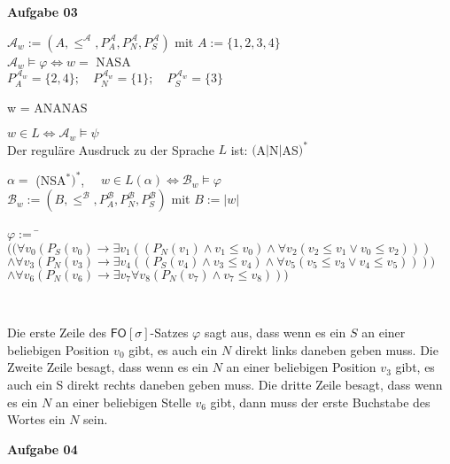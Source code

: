 \documentclass[a4paper,10pt]{article}
\begin{document}
	\textbf{Aufgabe 03}
	\begin{compactenum} [(a)]
		\item $ \mathcal{A}_w := (A, \leq^\mathcal{A}, P_A^\mathcal{A}, P_N^\mathcal{A}, P_S^\mathcal{A}) $ mit $ A:= \{1,2,3,4\} $\\
		$ \mathcal{A}_w \models \varphi \Longleftrightarrow  w =$ NASA  \\
		$ P_A^{\mathcal{A}_w} = \{2,4\};\quad P_N^{\mathcal{A}_w} = \{1\};\quad P_S^{\mathcal{A}_w} = \{3\} $ \\
		\item w = ANANAS \ \\
		\item $ w \in L \Longleftrightarrow \mathcal{A}_w \models \psi $ \\
		Der reguläre Ausdruck zu der Sprache $ L $ ist: $ ($A$|$N$|$AS$)^*$ \ \\
		\item $ \alpha = $ (NSA$^*)^*$, $ \quad w \in L(\alpha)  \Longleftrightarrow \mathcal{B}_w \models \varphi$\\
		$ \mathcal{B}_w := (B, \leq^\mathcal{B}, P_A^\mathcal{B}, P_N^\mathcal{B}, P_S^\mathcal{B}) $ mit $ B:=|w| $ \\
		\begin{tabbing}
			$ \varphi := $ \=$ ((\forall v_0 (P_S(v_0)\rightarrow \exists v_1((P_N(v_1)\wedge v_1 \leq v_0) \wedge \forall v_2(v_2 \leq v_1 \vee v_0 \leq v_2 ))) $\\
			\> $ \wedge \forall v_3 (P_N(v_3)\rightarrow \exists v_4((P_S(v_4)\wedge v_3 \leq v_4) \wedge \forall v_5(v_5 \leq v_3 \vee v_4 \leq v_5 )))) $\\ 
			\> $ \wedge \forall v_6(P_N(v_6)\rightarrow \exists v_7\forall v_8(P_N(v_7)\wedge v_7 \leq v_8))) $
		\end{tabbing} \
		
		Die erste Zeile des $\mathsf{FO}[\sigma]$-Satzes $ \varphi $ sagt aus, dass wenn es ein $S$ an einer beliebigen Position $ v_0 $ gibt, es auch ein $N$ direkt links daneben geben muss. Die Zweite Zeile besagt, dass wenn es ein $N$ an einer beliebigen Position $ v_3 $ gibt, es auch ein S direkt rechts daneben geben muss. Die dritte Zeile besagt, dass wenn es ein $N$ an einer beliebigen Stelle $ v_6 $ gibt, dann muss der erste Buchstabe des Wortes ein $N$ sein. 
		
	\end{compactenum}
	\newpage
	\textbf{Aufgabe 04}
\end{document}
